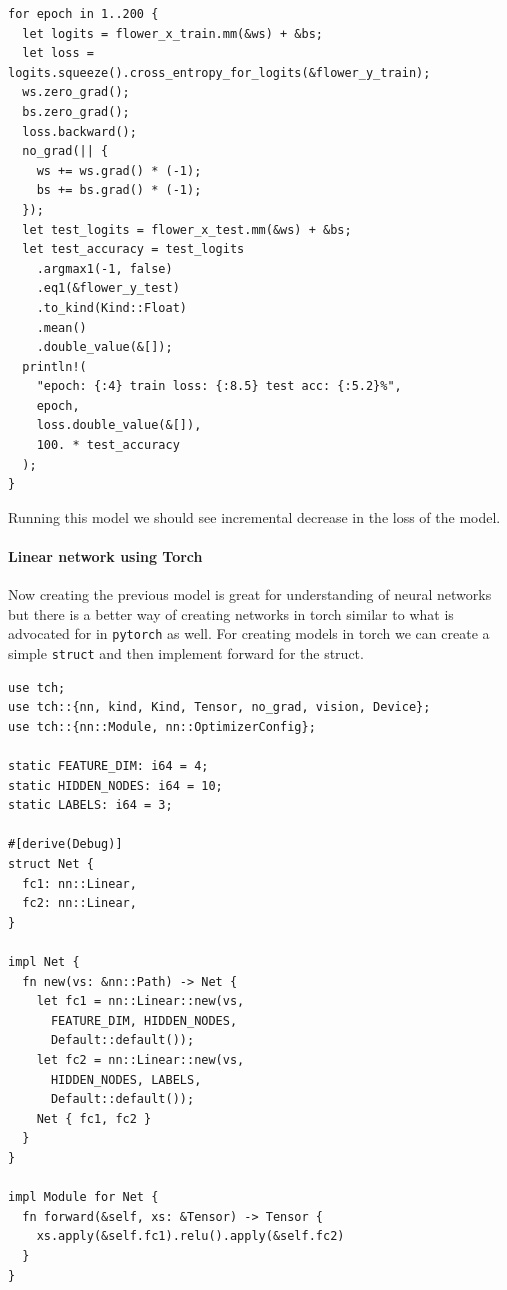 \documentclass{book}
\begin{document}
\begin{lstlisting}[caption={chapter3\\/iris\_classification\_tchrs\\/src\\/main\\.rs}]
for epoch in 1..200 {
  let logits = flower_x_train.mm(&ws) + &bs;
  let loss = logits.squeeze().cross_entropy_for_logits(&flower_y_train);
  ws.zero_grad();
  bs.zero_grad();
  loss.backward();
  no_grad(|| {
    ws += ws.grad() * (-1);
    bs += bs.grad() * (-1);
  });
  let test_logits = flower_x_test.mm(&ws) + &bs;
  let test_accuracy = test_logits
    .argmax1(-1, false)
    .eq1(&flower_y_test)
    .to_kind(Kind::Float)
    .mean()
    .double_value(&[]);
  println!(
    "epoch: {:4} train loss: {:8.5} test acc: {:5.2}%",
    epoch,
    loss.double_value(&[]),
    100. * test_accuracy
  );
}
\end{lstlisting}

Running this model we should see incremental decrease in the loss of the model.
\label{par:}
\paragraph{Linear network using Torch}%
Now creating the previous model is great for understanding of neural networks but there is a better way of creating networks in torch similar to what is advocated for in \lstinline{pytorch} as well. For creating models in torch we can create a simple \lstinline{struct} and then implement forward for the struct.

\begin{lstlisting}[caption={chapter2\\/iris\_classification\_tchrs\\/src\\/linear\_with\_sgd\\.rs}]
use tch;
use tch::{nn, kind, Kind, Tensor, no_grad, vision, Device};
use tch::{nn::Module, nn::OptimizerConfig};

static FEATURE_DIM: i64 = 4;
static HIDDEN_NODES: i64 = 10;
static LABELS: i64 = 3;

#[derive(Debug)]
struct Net {
  fc1: nn::Linear,
  fc2: nn::Linear,
}

impl Net {
  fn new(vs: &nn::Path) -> Net {
    let fc1 = nn::Linear::new(vs,
      FEATURE_DIM, HIDDEN_NODES,
      Default::default());
    let fc2 = nn::Linear::new(vs,
      HIDDEN_NODES, LABELS,
      Default::default());
    Net { fc1, fc2 }
  }
}

impl Module for Net {
  fn forward(&self, xs: &Tensor) -> Tensor {
    xs.apply(&self.fc1).relu().apply(&self.fc2)
  }
}
\end{lstlisting}
\end{document}
